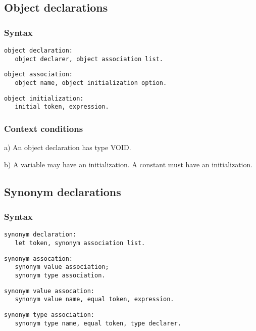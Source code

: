 \documentclass [a4paper,12pt,fleqn]{article}
\begin{document}
\subsection {Object declarations}
\subsubsection*{Syntax}
\begin{letterlist}
\item
\begin{verbatim}
object declaration:
   object declarer, object association list.
\end{verbatim}
\item
\begin{verbatim}
object association:
   object name, object initialization option.
\end{verbatim}
\item
\begin{verbatim}
object initialization:
   initial token, expression.
\end{verbatim}
\end{letterlist}
\subsubsection*{Context conditions}
\begin{list}{-}{}
\item[a)]
An object declaration has type VOID.
\item[b)]
A variable may have an initialization. A constant must have an initialization.
\end{list}
\subsection {Synonym declarations}
\subsubsection*{Syntax}
\begin{letterlist}
\item
\begin{verbatim}
synonym declaration:
   let token, synonym association list.
\end{verbatim}
\item
\begin{verbatim}
synonym assocation:
   synonym value association;
   synonym type association.
\end{verbatim}
\item
\begin{verbatim}
synonym value assocation:
   synonym value name, equal token, expression.
\end{verbatim}
\item
\begin{verbatim}
synonym type association:
   synonym type name, equal token, type declarer.
\end{verbatim}
\end{letterlist}
\end{document}
